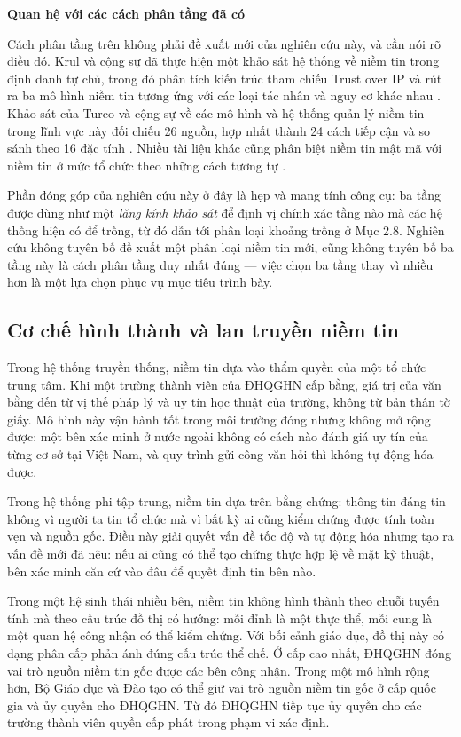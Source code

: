 \noindent \textbf{Quan hệ với các cách phân tầng đã có}

Cách phân tầng trên không phải đề xuất mới của nghiên cứu này, và cần nói rõ điều đó. Krul và cộng sự đã thực hiện một khảo sát hệ thống về niềm tin trong định danh tự chủ, trong đó phân tích kiến trúc tham chiếu Trust over IP và rút ra ba mô hình niềm tin tương ứng với các loại tác nhân và nguy cơ khác nhau \cite{Krul2024}. Khảo sát của Turco và cộng sự về các mô hình và hệ thống quản lý niềm tin trong lĩnh vực này đối chiếu 26 nguồn, hợp nhất thành 24 cách tiếp cận và so sánh theo 16 đặc tính \cite{Turco2026}. Nhiều tài liệu khác cũng phân biệt niềm tin mật mã với niềm tin ở mức tổ chức theo những cách tương tự \cite{Muhle2018, Sedlmeir2021}.

Phần đóng góp của nghiên cứu này ở đây là hẹp và mang tính công cụ: ba tầng được dùng như một \emph{lăng kính khảo sát} để định vị chính xác tầng nào mà các hệ thống hiện có để trống, từ đó dẫn tới phân loại khoảng trống ở Mục 2.8. Nghiên cứu không tuyên bố đề xuất một phân loại niềm tin mới, cũng không tuyên bố ba tầng này là cách phân tầng duy nhất đúng --- việc chọn ba tầng thay vì nhiều hơn là một lựa chọn phục vụ mục tiêu trình bày.

\subsection{Cơ chế hình thành và lan truyền niềm tin}

Trong hệ thống truyền thống, niềm tin dựa vào thẩm quyền của một tổ chức trung tâm. Khi một trường thành viên của ĐHQGHN cấp bằng, giá trị của văn bằng đến từ vị thế pháp lý và uy tín học thuật của trường, không từ bản thân tờ giấy. Mô hình này vận hành tốt trong môi trường đóng nhưng không mở rộng được: một bên xác minh ở nước ngoài không có cách nào đánh giá uy tín của từng cơ sở tại Việt Nam, và quy trình gửi công văn hỏi thì không tự động hóa được.

Trong hệ thống phi tập trung, niềm tin dựa trên bằng chứng: thông tin đáng tin không vì người ta tin tổ chức mà vì bất kỳ ai cũng kiểm chứng được tính toàn vẹn và nguồn gốc. Điều này giải quyết vấn đề tốc độ và tự động hóa nhưng tạo ra vấn đề mới đã nêu: nếu ai cũng có thể tạo chứng thực hợp lệ về mặt kỹ thuật, bên xác minh căn cứ vào đâu để quyết định tin bên nào.

Trong một hệ sinh thái nhiều bên, niềm tin không hình thành theo chuỗi tuyến tính mà theo cấu trúc đồ thị có hướng: mỗi đỉnh là một thực thể, mỗi cung là một quan hệ công nhận có thể kiểm chứng. Với bối cảnh giáo dục, đồ thị này có dạng phân cấp phản ánh đúng cấu trúc thể chế. Ở cấp cao nhất, ĐHQGHN đóng vai trò nguồn niềm tin gốc được các bên công nhận. Trong một mô hình rộng hơn, Bộ Giáo dục và Đào tạo có thể giữ vai trò nguồn niềm tin gốc ở cấp quốc gia và ủy quyền cho ĐHQGHN. Từ đó ĐHQGHN tiếp tục ủy quyền cho các trường thành viên quyền cấp phát trong phạm vi xác định.

